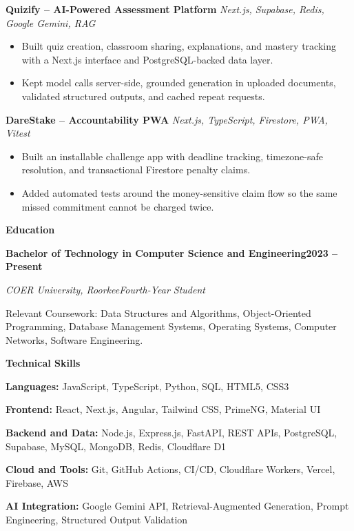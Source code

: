 \documentclass[11pt,a4paper]{article}
\newcommand{\sectiongap}{\vspace{4pt plus 6pt}}
\newcommand{\sectiontitle}[1]{%
  \sectiongap
  {\large\bfseries #1}\par
  \vspace{2pt}{\color{rulecolor}\hrule height 0.5pt}\vspace{4pt}
}
\newcommand{\entry}[4]{%
  \textbf{#1}\hfill\textbf{#2}\par
  \textit{#3}\hfill\textit{#4}\par
  \vspace{1pt}
}
\newcommand{\project}[2]{%
  \vspace{3pt}
  \textbf{#1} \textbar{} \textit{#2}\par
}
\newcommand{\skillline}[2]{\textbf{#1:} #2\par\vspace{2.2pt}}
\begin{document}
\project{Quizify -- AI-Powered Assessment Platform}{Next.js, Supabase, Redis, Google Gemini, RAG}
\begin{itemize}
  \item Built quiz creation, classroom sharing, explanations, and mastery tracking with a Next.js interface and PostgreSQL-backed data layer.
  \item Kept model calls server-side, grounded generation in uploaded documents, validated structured outputs, and cached repeat requests.
\end{itemize}

\project{DareStake -- Accountability PWA}{Next.js, TypeScript, Firestore, PWA, Vitest}
\begin{itemize}
  \item Built an installable challenge app with deadline tracking, timezone-safe resolution, and transactional Firestore penalty claims.
  \item Added automated tests around the money-sensitive claim flow so the same missed commitment cannot be charged twice.
\end{itemize}

\sectiontitle{Education}
\entry{Bachelor of Technology in Computer Science and Engineering}{2023 -- Present}{COER University, Roorkee}{Fourth-Year Student}
{\small Relevant Coursework: Data Structures and Algorithms, Object-Oriented Programming, Database Management Systems, Operating Systems, Computer Networks, Software Engineering.}

\sectiontitle{Technical Skills}
\skillline{Languages}{JavaScript, TypeScript, Python, SQL, HTML5, CSS3}
\skillline{Frontend}{React, Next.js, Angular, Tailwind CSS, PrimeNG, Material UI}
\skillline{Backend and Data}{Node.js, Express.js, FastAPI, REST APIs, PostgreSQL, Supabase, MySQL, MongoDB, Redis, Cloudflare D1}
\skillline{Cloud and Tools}{Git, GitHub Actions, CI/CD, Cloudflare Workers, Vercel, Firebase, AWS}
\skillline{AI Integration}{Google Gemini API, Retrieval-Augmented Generation, Prompt Engineering, Structured Output Validation}

\vfill
\end{document}
